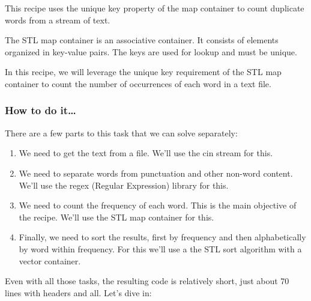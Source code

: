 
This recipe uses the unique key property of the map container to count duplicate words from a stream of text.

The STL map container is an associative container. It consists of elements organized in key-value pairs. The keys are used for lookup and must be unique.

In this recipe, we will leverage the unique key requirement of the STL map container to count the number of occurrences of each word in a text file.

\subsubsection{How to do it…}

There are a few parts to this task that we can solve separately:

\begin{enumerate}
\item 
We need to get the text from a file. We'll use the cin stream for this.

\item 
We need to separate words from punctuation and other non-word content. We'll use the regex (Regular Expression) library for this.

\item 
We need to count the frequency of each word. This is the main objective of the recipe. We'll use the STL map container for this.

\item 
Finally, we need to sort the results, first by frequency and then alphabetically by word within frequency. For this we'll use a the STL sort algorithm with a vector container.
\end{enumerate}

Even with all those tasks, the resulting code is relatively short, just about 70 lines with headers and all. Let's dive in:

